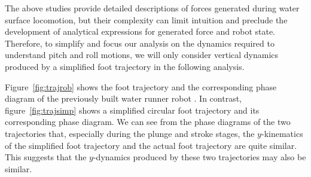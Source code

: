 \documentclass[letterpaper, 10 pt, conference]{ieeeconf}  %
\begin{document}
The above studies provide detailed descriptions of forces generated during water surface locomotion, but their complexity can limit intuition and preclude the development of analytical expressions for generated force and robot state.  Therefore, to simplify and focus our analysis on the dynamics required to understand pitch and roll motions, we will only consider vertical dynamics produced by a simplified foot trajectory in the following analysis. 

Figure~\ref{fig:trajrob} shows the foot trajectory  and the corresponding phase diagram of the previously built water runner robot \cite{park2010roll}. In contrast, figure~\ref{fig:trajsimp} shows a simplified circular foot trajectory and its corresponding phase diagram. We can see from the phase diagrams of the two trajectories that, especially during the plunge and stroke stages, the $y$-kinematics of the simplified foot trajectory and the actual foot trajectory are quite similar. This suggests that the $y$-dynamics produced by these two trajectories may also be similar.
\end{document}
